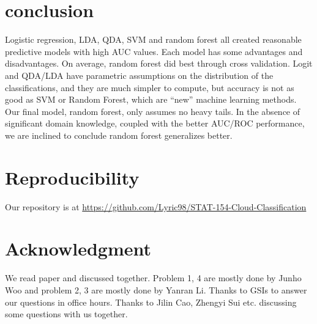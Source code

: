 \documentclass[12pt]{extarticle}
\begin{document}
\section{conclusion}

Logistic regression, LDA, QDA, SVM and random forest all created reasonable predictive models with high AUC values.  Each model has some advantages and disadvantages. On average, random forest did best through cross validation. Logit and QDA/LDA have parametric assumptions on the distribution of the classifications, and they are much simpler to compute, but accuracy is not as good as SVM or Random Forest, which are “new” machine learning methods. Our final model, random forest,
only assumes no heavy tails. In the absence of significant domain knowledge, coupled with the better AUC/ROC performance, we are inclined to conclude random forest generalizes better. 


\section{Reproducibility}
Our repository is at \href{https://github.com/Lyric98/STAT-154-Cloud-Classification}{https://github.com/Lyric98/STAT-154-Cloud-Classification}


\section{Acknowledgment}
We read paper and discussed together. Problem 1, 4 are mostly done by Junho Woo and problem 2, 3 are mostly done by Yanran Li. Thanks to GSIs to answer our questions in office hours. Thanks to Jilin Cao, Zhengyi Sui etc. discussing some questions with us together.






\end{document}
